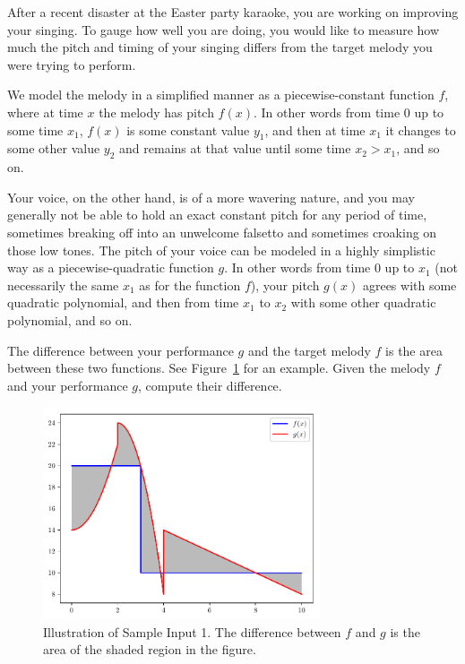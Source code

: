 
\noindent
After a recent disaster at the Easter party karaoke, you are working
on improving your singing. To gauge how well you are doing, you would
like to measure how much the pitch and timing of your singing differs
from the target melody you were trying to perform.

We model the melody in a simplified manner as a piecewise-constant
function $f$, where at time $x$ the melody has pitch $f(x)$. In other
words from time $0$ up to some time $x_1$, $f(x)$ is some constant
value $y_1$, and then at time $x_1$ it changes to some other value
$y_2$ and remains at that value until some time $x_2 > x_1$, and so
on.

Your voice, on the other hand, is of a more wavering nature, and you
may generally not be able to hold an exact constant pitch for any
period of time, sometimes breaking off into an unwelcome falsetto and
sometimes croaking on those low tones.  The pitch of your
voice can be modeled in a highly simplistic way as a
piecewise-quadratic function $g$. In other words from time $0$ up to
$x_1$ (not necessarily the same $x_1$ as for the function $f$), your
pitch $g(x)$ agrees with some quadratic polynomial, and then from time
$x_1$ to $x_2$ with some other quadratic polynomial, and so on.

The difference between your performance $g$ and the target melody $f$
is the area between these two functions.  See Figure~\ref{fig:pitch}
for an example.  Given the melody $f$ and your performance $g$,
compute their difference.

\begin{figure}[h]
\includegraphics[width=0.73\textwidth]{sample1.pdf}
\centering
\caption{Illustration of Sample Input 1.  The difference between $f$ and $g$ is the area of the shaded region in the figure.}
\label{fig:pitch}
\end{figure}

